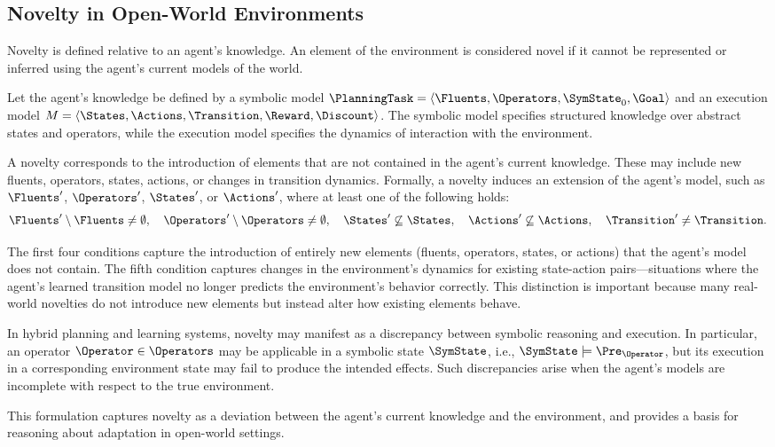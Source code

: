 \subsection{Novelty in Open-World Environments}
\label{sec:novelty}

Novelty is defined relative to an agent’s knowledge. An element of the environment is considered novel if it cannot be represented or inferred using the agent’s current models of the world.

Let the agent’s knowledge be defined by a symbolic model $\PlanningTask = \langle \Fluents, \Operators, \SymState_0, \Goal \rangle$ and an execution model $M = \langle \States, \Actions, \Transition, \Reward, \Discount \rangle$. The symbolic model specifies structured knowledge over abstract states and operators, while the execution model specifies the dynamics of interaction with the environment.

A novelty corresponds to the introduction of elements that are not contained in the agent’s current knowledge. These may include new fluents, operators, states, actions, or changes in transition dynamics. Formally, a novelty induces an extension of the agent’s model, such as $\Fluents'$, $\Operators'$, $\States'$, or $\Actions'$, where at least one of the following holds:
\[
\Fluents' \setminus \Fluents \neq \emptyset, \quad
\Operators' \setminus \Operators \neq \emptyset, \quad
\States' \not\subseteq \States, \quad
\Actions' \not\subseteq \Actions, \quad
\Transition' \neq \Transition.
\]

The first four conditions capture the introduction of entirely new elements (fluents, operators, states, or actions) that the agent's model does not contain. The fifth condition captures changes in the environment's dynamics for existing state-action pairs---situations where the agent's learned transition model no longer predicts the environment's behavior correctly. This distinction is important because many real-world novelties do not introduce new elements but instead alter how existing elements behave.

In hybrid planning and learning systems, novelty may manifest as a discrepancy between symbolic reasoning and execution. In particular, an operator $\Operator \in \Operators$ may be applicable in a symbolic state $\SymState$, i.e., $\SymState \models \Pre_{\Operator}$, but its execution in a corresponding environment state may fail to produce the intended effects. Such discrepancies arise when the agent’s models are incomplete with respect to the true environment.

This formulation captures novelty as a deviation between the agent’s current knowledge and the environment, and provides a basis for reasoning about adaptation in open-world settings.